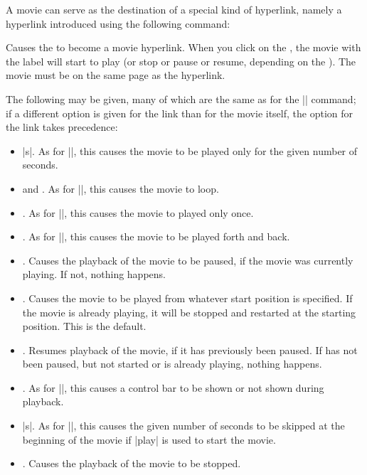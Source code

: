 A movie can serve as the destination of a special kind of hyperlink,
namely a hyperlink introduced using the following command:

\begin{command}{\hyperlinkmovie{}}
  Causes the  to become a movie hyperlink. When you click
  on the , the movie with the label  will
  start to play (or stop or pause or resume, depending on the
  ). The movie must be on the same page as the
  hyperlink.

  The following  may be given, many of which are the
  same as for the |\movie| command; if a different option is given for
  the link than for the movie itself, the option for the link takes precedence:
  \begin{itemize}
  \item
    |s|. As for |\movie|, this causes
    the movie to be played only for the given number of seconds.
  \item
     and .  As for |\movie|, this causes
    the movie to loop.
  \item
    .  As for |\movie|, this causes
    the movie to played only once.
  \item
    .  As for |\movie|, this causes
    the movie to be played forth and back.
  \item
    . Causes the playback of the movie to be paused, if
    the movie was currently playing. If not, nothing happens.
  \item
    . Causes the movie to be played from whatever start
    position is specified. If the movie is already playing, it will be
    stopped and restarted at the starting position. This is the default.
  \item
    . Resumes playback of the movie, if it has
    previously been paused. If has not been paused, but not started or
    is already playing, nothing happens.
  \item
    . As for |\movie|, this
    causes a control bar to be shown or not shown during playback.
  \item
    |s|. As for |\movie|, this causes
    the given number of seconds to be skipped at the beginning of the
    movie if |play| is used to start the movie.
  \item
    . Causes the playback of the movie to be stopped.
  \end{itemize}
\end{command}



